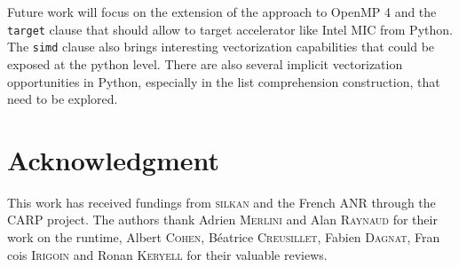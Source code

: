 \documentclass[conference]{IEEEtran}
\begin{document}
Future work will focus on the extension of the approach to OpenMP 4 and the
\texttt{target} clause that should allow to target accelerator like Intel MIC
from Python.
The \texttt{simd} clause also brings interesting vectorization capabilities that
could be exposed at the python level. There are also several implicit
vectorization opportunities in Python, especially in the list comprehension
construction, that need to be explored.

\section*{Acknowledgment}

This work has received fundings from \textsc{silkan} and the French ANR through
the CARP project. The authors thank Adrien \textsc{Merlini} and Alan
\textsc{Raynaud} for their work on the runtime, Albert \textsc{Cohen},
B{\'e}atrice \textsc{Creusillet}, Fabien \textsc{Dagnat}, Fran{\,c}ois
\textsc{Irigoin} and Ronan \textsc{Keryell} for their valuable reviews.



\end{document}
